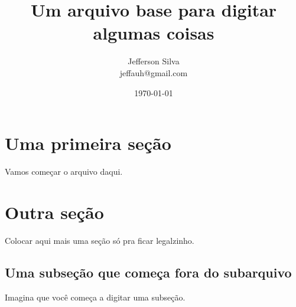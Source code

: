 \documentclass[11p, %
			   openany, %
			   twoside, %
			   brazil %
			   ]{article}
\title{Um arquivo base para digitar algumas coisas}   	%
\author{Jefferson Silva \\								%
		\small{jeffauh@gmail.com}
		}
\date{\today}											%
\theoremstyle{thm}							%
\theoremstyle{definicao}
\begin{document}
\maketitle						%

\frenchspacing					%
\onehalfspacing					%

\section{Uma primeira seção}

Vamos começar o arquivo daqui.



\section{Outra seção}

Colocar aqui mais uma seção só pra ficar legalzinho.

\subsection{Uma subseção que começa fora do subarquivo}

Imagina que você começa a digitar uma subseção. 


\nocite{*}						  %
\end{document}

